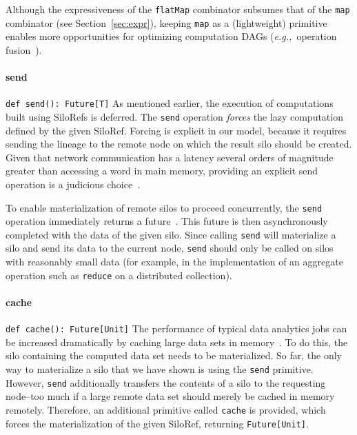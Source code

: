 \documentclass[preprint]{sigplanconf}
\theoremstyle{definition}
\theoremstyle{definition}
\newcommand{\eg}{{\em e.g.,~}}
\begin{document}
Although the expressiveness of the \verb|flatMap| combinator subsumes that of
the \verb|map| combinator (see Section~\ref{sec:expr}), keeping \verb|map| as
a (lightweight) primitive enables more opportunities for optimizing
computation DAGs (\eg operation fusion~\cite{FlumeJava}).

\paragraph{send} \texttt{def send(): Future[T]}
\newline As mentioned earlier, the execution of computations built using
SiloRefs is deferred. The \verb|send| operation {\em forces} the lazy
computation defined by the given SiloRef. Forcing is explicit in our model,
because it requires sending the lineage to the remote node on which the result
silo should be created. Given that network communication has a latency several
orders of magnitude greater than accessing a word in main memory, providing an
explicit send operation is a judicious choice~\cite{ANoteDistComp}.

To enable materialization of remote silos to proceed concurrently, the
\verb|send| operation immediately returns a future~\cite{Futures}. This future
is then asynchronously completed with the data of the given silo. Since
calling \verb|send| will materialize a silo and send its data to the current
node, \verb|send| should only be called on silos with reasonably small data
(for example, in the implementation of an aggregate operation such as
\verb|reduce| on a distributed collection).

\paragraph{cache} \texttt{def cache(): Future[Unit]}
\newline The performance of typical data analytics jobs can be increased
dramatically by caching large data sets in memory~\cite{Spark}. To do this,
the silo containing the computed data set needs to be materialized. So far,
the only way to materialize a silo that we have shown is using the \verb|send|
primitive. However, \verb|send| additionally transfers the contents of a silo
to the requesting node--too much if a large remote data set should merely be
cached in memory remotely. Therefore, an additional primitive called
\verb|cache| is provided, which forces the materialization of the given
SiloRef, returning \verb|Future[Unit]|.
\end{document}
